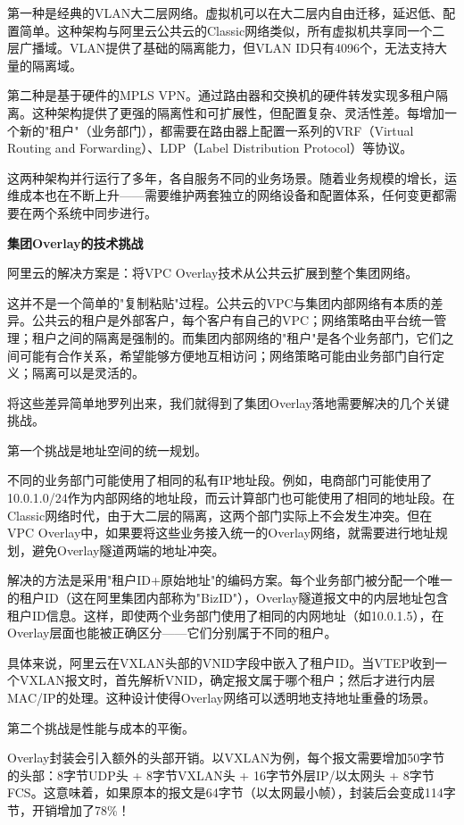 第一种是经典的VLAN大二层网络。虚拟机可以在大二层内自由迁移，延迟低、配置简单。这种架构与阿里云公共云的Classic网络类似，所有虚拟机共享同一个二层广播域。VLAN提供了基础的隔离能力，但VLAN ID只有4096个，无法支持大量的隔离域。

第二种是基于硬件的MPLS VPN。通过路由器和交换机的硬件转发实现多租户隔离。这种架构提供了更强的隔离性和可扩展性，但配置复杂、灵活性差。每增加一个新的"租户"（业务部门），都需要在路由器上配置一系列的VRF（Virtual Routing and Forwarding）、LDP（Label Distribution Protocol）等协议。

这两种架构并行运行了多年，各自服务不同的业务场景。随着业务规模的增长，运维成本也在不断上升——需要维护两套独立的网络设备和配置体系，任何变更都需要在两个系统中同步进行。

\textbf{集团Overlay的技术挑战}

阿里云的解决方案是：将VPC Overlay技术从公共云扩展到整个集团网络。

这并不是一个简单的"复制粘贴"过程。公共云的VPC与集团内部网络有本质的差异。公共云的租户是外部客户，每个客户有自己的VPC；网络策略由平台统一管理；租户之间的隔离是强制的。而集团内部网络的"租户"是各个业务部门，它们之间可能有合作关系，希望能够方便地互相访问；网络策略可能由业务部门自行定义；隔离可以是灵活的。

将这些差异简单地罗列出来，我们就得到了集团Overlay落地需要解决的几个关键挑战。

第一个挑战是地址空间的统一规划。

不同的业务部门可能使用了相同的私有IP地址段。例如，电商部门可能使用了10.0.1.0/24作为内部网络的地址段，而云计算部门也可能使用了相同的地址段。在Classic网络时代，由于大二层的隔离，这两个部门实际上不会发生冲突。但在VPC Overlay中，如果要将这些业务接入统一的Overlay网络，就需要进行地址规划，避免Overlay隧道两端的地址冲突。

解决的方法是采用"租户ID+原始地址"的编码方案。每个业务部门被分配一个唯一的租户ID（这在阿里集团内部称为"BizID"），Overlay隧道报文中的内层地址包含租户ID信息。这样，即使两个业务部门使用了相同的内网地址（如10.0.1.5），在Overlay层面也能被正确区分——它们分别属于不同的租户。

具体来说，阿里云在VXLAN头部的VNID字段中嵌入了租户ID。当VTEP收到一个VXLAN报文时，首先解析VNID，确定报文属于哪个租户；然后才进行内层MAC/IP的处理。这种设计使得Overlay网络可以透明地支持地址重叠的场景。

第二个挑战是性能与成本的平衡。

Overlay封装会引入额外的头部开销。以VXLAN为例，每个报文需要增加50字节的头部：8字节UDP头 + 8字节VXLAN头 + 16字节外层IP/以太网头 + 8字节FCS。这意味着，如果原本的报文是64字节（以太网最小帧），封装后会变成114字节，开销增加了78\%！

